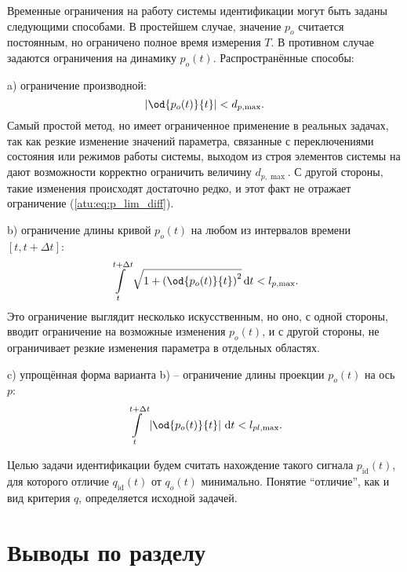 Временные ограничения на работу системы идентификации могут быть заданы
следующими способами. В простейшем случае, значение $p_o$
считается постоянным, но ограничено полное время измерения $T$.
В противном случае задаются ограничения на динамику $p_o(t)$.
Распространённые способы:

a) ограничение производной:
%
\begin{equation}
  \left| \od{p_o(t)}{t} \right| < d_{p,\max}.
  \label{atu:eq:p_lim_diff}
\end{equation}
Самый простой метод, но имеет ограниченное применение в реальных
задачах, так как резкие изменение значений параметра,
связанные с переключениями состояния или режимов работы системы,
выходом из строя элементов системы на дают возможности корректно ограничить
величину  $d_{p,\max}$. С другой стороны, такие изменения
происходят достаточно редко, и этот факт не отражает ограничение (\ref{atu:eq:p_lim_diff}).

b) ограничение длины кривой $p_o(t)$ на любом из интервалов времени $[t,t+\Delta t]$:
\begin{equation}
  \int\limits_{t}^{t+\Delta t} \sqrt{1 + \left( \od{p_o(t)}{t} \right)^2 } \, \mathrm{d}t < l_{p,\max}.
  \label{atu:eq:p_lim_l}
\end{equation}
%
Это ограничение выглядит несколько искусственным,
но оно, с одной стороны, вводит ограничение на возможные изменения $p_o(t)$,
и с другой стороны, не ограничивает резкие изменения параметра в отдельных областях.

c) упрощённая форма варианта b) -- ограничение длины проекции  $p_o(t)$ на ось $p$:
\begin{equation}
  \int\limits_{t}^{t+\Delta t} \left| \od{p_o(t)}{t} \right | \, \mathrm{d}t < l_{pl,\max}.
  \label{atu:eq:p_lim_pl}
\end{equation}

Целью задачи идентификации будем считать нахождение
такого сигнала $p_\mathrm{id}(t)$, для которого
отличие $q_\mathrm{id}(t)$ от $q_o(t)$ минимально.
Понятие ``отличие'', как и вид критерия $q$, определяется исходной задачей.









\section{Выводы по разделу \thechapter}  %




